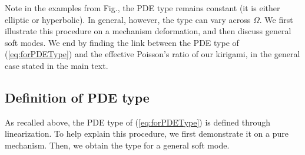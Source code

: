 \documentclass[aps,11pt,tightenlines,notitlepage,superscriptaddress,longbibliography,nofootinbib]{revtex4-1}
\begin{document}
Note in the examples from Fig., the PDE type remains constant (it is either elliptic or hyperbolic). In general, however, the type can vary across  $\Omega$. We first illustrate this procedure on a mechanism deformation, and then discuss general soft modes. We end by finding the link between the PDE type of (\ref{eq:forPDEType}) and the effective Poisson's ratio of our kirigami, in the general case stated in the main text.

\subsection{Definition of  PDE type}
As recalled above, the PDE type of (\ref{eq:forPDEType}) is defined through  linearization. To help explain this procedure, we first demonstrate it on a pure mechanism. Then, we obtain the type for a general soft mode.
\end{document}
